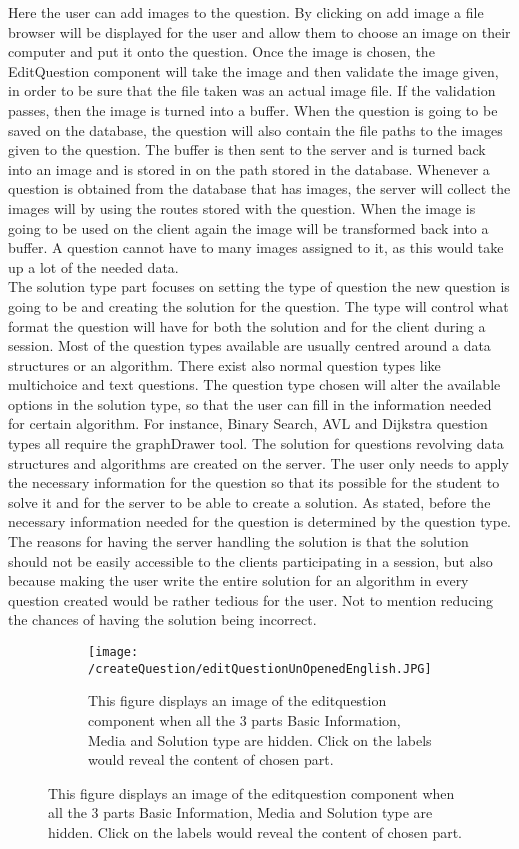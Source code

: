 Here the user can add images to the question.  By clicking on add image a file browser will be displayed for the user and allow them to choose an image on their computer and put it onto the question. Once the image is chosen, the EditQuestion component will take the image and then validate the image given, in order to be sure that the file taken was an actual image file. If the validation passes, then the image is turned into a buffer. When the question is going to be saved on the database, the question will also contain the file paths to the images given to the question. The buffer is then sent to the server and is turned back into an image and is stored in on the path stored in the database. Whenever a question is obtained from the database that has images, the server will collect the images will by using the routes stored with the question. When the image is going to be used on the client again the image will be transformed back into a buffer. A question cannot have to many images assigned to it, as this would take up a lot of the needed data.\\[11pt]
The solution type part focuses on setting the type of question the new question is going to be and creating the solution for the question. The type will control what format the question will have for both the solution and for the client during a session. Most of the question types available are usually centred around a data structures or an algorithm. There exist also normal question types like multichoice and text questions. The question type chosen will alter the available options in the solution type, so that the user can fill in the information needed for certain algorithm. For instance, Binary Search, AVL and Dijkstra question types all require the graphDrawer tool. The solution for questions revolving data structures and algorithms are created on the server. The user only needs to apply the necessary information for the question so that its possible for the student to solve it and for the server to be able to create a solution. As stated, before the necessary information needed for the question is determined by the question type. The reasons for having the server handling the solution is that the solution should not be easily accessible to the clients participating in a session, but also because making the user write the entire solution for an algorithm in every question created would be rather tedious for the user. Not to mention reducing the chances of having the solution being incorrect.
\begin{figure}[H]
	\centering
	\begin{subfigure}{0.30\linewidth}
		\texttt{[image: /createQuestion/editQuestionUnOpenedEnglish.JPG]}
		\caption{This figure displays an image of the editquestion component when all the 3 parts Basic Information, Media and Solution type are hidden. Click on the labels would reveal the content of chosen part.}
		\label{fig:editquestionUnOpened}
	\end{subfigure}
\end{figure}
